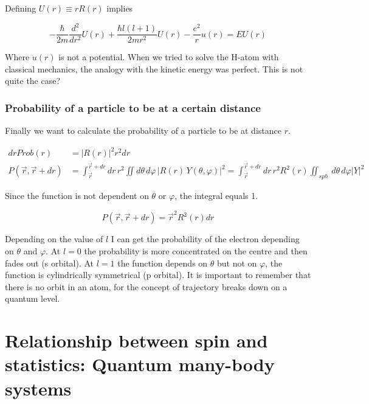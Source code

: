 		Defining $U(r) \equiv rR(r)$ implies

		$$-\frac{\hbar}{2m} \frac{d^2}{dr^2} U(r) + \frac{\hbar l(l+1)}{2mr^2} U(r) - \frac{e^2}{r} u(r) = E U(r)$$

		Where $u(r)$ is not a potential.
		When we tried to solve the H-atom with classical mechanics, the analogy with the kinetic energy was perfect.
		This is not quite the case?

		\subsubsection{Probability of a particle to be at a certain distance}
		Finally we want to calculate the probability of a particle to be at distance $r$.

		\begin{align*}
			drProb(r)&=|R(r)|^2r^2dr\\
			P(\vec{r},\vec{r}+dr)&=\int_{\vec{r}}^{\vec{r}+dr}dr\,r^2\iint d\theta\,d\varphi\,|R(r)\,Y(\theta,\varphi)|^2=\int_{\vec{r}}^{\vec{r}+dr}dr\,r^2R^2(r)\iint_{sph}\,d\theta\,d\varphi|Y|^2
		\end{align*}

		Since the function is not dependent on $\theta$ or $\varphi$, the integral equals 1.

		$$P(\vec{r},\vec{r}+dr)=\vec{r}^2R^2(r)dr$$

		Depending on the value of $l$ I can get the probability of the electron depending on $\theta$ and $\varphi$.
		At $l=0$ the probability is more concentrated on the centre and then fades out (s orbital).
		At $l=1$ the function depends on $\theta$ but not on $\varphi$, the function is cylindrically symmetrical (p orbital).
		It is important to remember that there is no orbit in an atom, for the concept of trajectory breaks down on a quantum level.

\section{Relationship between spin and statistics: Quantum many-body systems}

